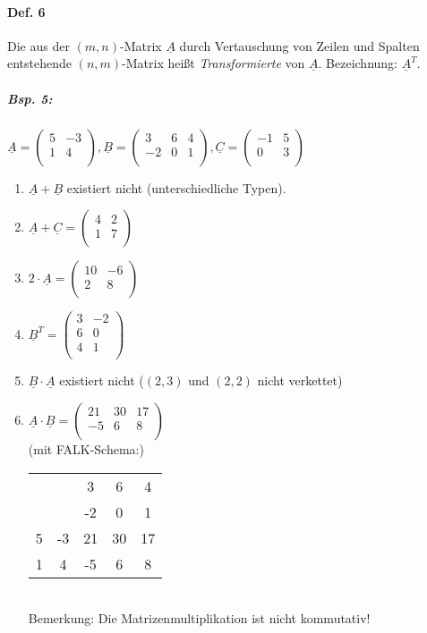 \paragraph{Def. 6} \parskp
Die  aus der $(m,n)$-Matrix $\underline{A}$ durch Vertauschung von Zeilen und Spalten entstehende $(n,m)$-Matrix heißt \emph{Transformierte} von $\underline{A}$. Bezeichnung: $\underline{A}^T$.

\subparagraph{Bsp. 5:} \parskp
$\underline{A}=\begin{pmatrix}
5 & -3\\
1 & 4\\
\end{pmatrix}, \underline{B}=\begin{pmatrix}
3 & 6 & 4\\
-2 & 0 & 1\\
\end{pmatrix}, \underline{C}=\begin{pmatrix}
-1 & 5\\
0 & 3\\
\end{pmatrix}$
\begin{enumerate}[label=\alph*.)]
\item $\underline{A}+\underline{B}$ existiert nicht (unterschiedliche Typen).
\item $\underline{A}+\underline{C}=\begin{pmatrix}
4 & 2\\
1 & 7\\
\end{pmatrix}$
\item $2\cdot \underline{A}=\begin{pmatrix}
10 & -6\\
2 & 8\\
\end{pmatrix}$
\item $\underline{B}^T=\begin{pmatrix}
3 & -2\\
6 & 0\\
4 & 1\\
\end{pmatrix}$
\item $\underline{B}\cdot \underline{A}$ existiert nicht ($(2,3)$ und $(2,2)$ nicht verkettet)
\item $\underline{A}\cdot \underline{B}=\begin{pmatrix}
21 & 30 & 17\\
-5 & 6 & 8\\
\end{pmatrix}$\\
(mit FALK-Schema:)
\begin{tabular}{c c | c c c}
 & & 3 & 6& 4\\
 & & -2 & 0 & 1\\
\hline
5 & -3 & 21 & 30 & 17\\
1 & 4 &  -5& 6 & 8\\
\end{tabular}\\
Bemerkung: Die Matrizenmultiplikation ist nicht kommutativ!
\end{enumerate}
